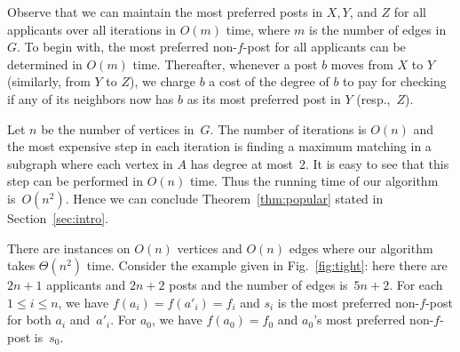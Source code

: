 \documentclass[11pt]{llncs}
\begin{document}
Observe that we can maintain the most preferred posts in $X, Y$, and $Z$ for all 
applicants over all iterations in $O(m)$ time, where $m$ is the number of edges in $G$. 
To begin with, the most preferred non-$f$-post for all applicants can be determined in $O(m)$ time. Thereafter, whenever a post $b$ moves from $X$ to $Y$ (similarly, from $Y$ to $Z$), we charge $b$ a cost of the degree of $b$ to pay for checking if any of its neighbors now has $b$ as its most preferred post in $Y$ (resp.,~$Z$). 

Let $n$ be the number of vertices in~$G$. The number of iterations is $O(n)$ and 
the most expensive step in each iteration is finding a maximum matching in a subgraph where 
each vertex in $A$ has degree at most~2. It is easy to see that this step can
be performed in $O(n)$ time. Thus the running time of our algorithm is~$O(n^2)$.
Hence we can conclude Theorem~\ref{thm:popular} stated in Section~\ref{sec:intro}.

\smallskip

There are instances on $O(n)$ vertices and $O(n)$ edges where our algorithm takes $\Theta(n^2)$ time. 
Consider the example given in Fig.~\ref{fig:tight}: here there are $2n+1$ applicants and $2n+2$ posts and the
number of edges is~$5n+2$.
For each $1 \le i \le n$, we have $f(a_i) = f(a'_i) = f_i$ and $s_i$ is the most preferred non-$f$-post for both $a_i$ and~$a'_i$.
For $a_0$, we have $f(a_0) = f_0$ and $a_0$'s most preferred non-$f$-post is~$s_0$.
\end{document}
